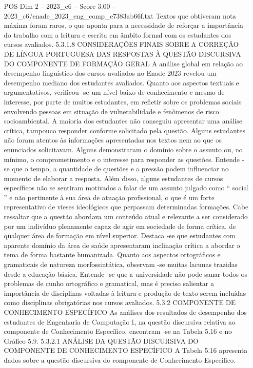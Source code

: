 \begin{textsample}{POS Dim 2 – 2023\_c6 – Score 3.00 – 2023\_c6/enade\_2023\_eng\_comp\_e7383ab66f.txt}
Textos que obtiveram nota máxima foram raros, o que aponta para a necessidade de reforçar a importância do trabalho com a leitura e escrita em âmbito formal com os estudantes dos cursos avaliados. 5.3.1.8 CONSIDERAÇÕES FINAIS SOBRE A CORREÇÃO DE LÍNGUA PORTUGUESA DAS RESPOSTAS À QUESTÃO DISCURSIVA DO COMPONENTE DE FORMAÇÃO GERAL A análise global em relação ao desempenho linguístico dos cursos avaliados no Enade 2023 revelou um desempenho mediano dos estudantes avaliados.
Quanto aos aspectos textuais e argumentativos, verificou -se um nível baixo de conhecimento e mesmo de interesse, por parte de muitos estudantes, em refletir sobre os problemas sociais envolvendo pessoas em situação de vulnerabilidade e fenômenos de risco socioambiental.
A maioria dos estudantes não conseguiu apresentar uma análise crítica, tampouco responder conforme solicitado pela questão.
Alguns estudantes não foram atentos às informações apresentadas nos textos nem ao que os enunciados solicitavam.
Alguns demonstraram o domínio sobre o assunto ou, no mínimo, o comprometimento e o interesse para responder as questões.
Entende -se que o tempo, a quantidade de questões e a pressão podem influenciar no momento de elaborar a resposta.
Além disso, alguns estudantes de cursos específicos não se sentiram motivados a falar de um assunto julgado como “ social ” e não pertinente à sua área de atuação profissional, o que é um forte representativo de vieses ideológicos que perpassam determinadas formações.
Cabe ressaltar que a questão abordava um conteúdo atual e relevante a ser considerado por um indivíduo plenamente capaz de agir em sociedade de forma crítica, de qualquer área de formação em nível superior.
Destaca -se que estudantes com aparente domínio da área de saúde apresentaram inclinação crítica a abordar o tema de forma bastante humanizada.
Quanto aos aspectos ortográficos e gramaticais de natureza morfossintática, observam -se muitas lacunas trazidas desde a educação básica.
Entende -se que a universidade não pode sanar todos os problemas de cunho ortográfico e gramatical, mas é preciso salientar a importância de disciplinas voltadas à leitura e produção de texto serem incluídas como disciplinas obrigatórias nos cursos avaliados. 5.3.2 COMPONENTE DE CONHECIMENTO ESPECÍFICO As análises dos resultados de desempenho dos estudantes de Engenharia de Computação I, na questão discursiva relativa ao componente de Conhecimento Específico, encontram -se na Tabela 5.16 e no Gráfico 5.9. 5.3.2.1 ANÁLISE DA QUESTÃO DISCURSIVA DO COMPONENTE DE CONHECIMENTO ESPECÍFICO A Tabela 5.16 apresenta dados sobre a questão discursiva do componente de Conhecimento Específico.

\end{textsample}
